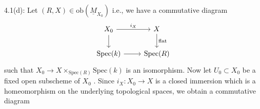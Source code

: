 4.1(d): Let $(R, X) \in \mathrm{ob}(\underline{M}_{X_0})$ i.e., we have a commutative diagram
\[
\begin{tikzcd}
X_0 \arrow[r, "i_X"] \arrow[d] & X \arrow[d, "\text{flat}"] \\
\mathrm{Spec}(k) \arrow[r] & \mathrm{Spec}(R)
\end{tikzcd}
\]
such that  $X_0 \to X \times_{\mathrm{Spec}(R)} \mathrm{Spec}(k)$  is an isomorphism. Now let  $U_0 \subset X_0$  be a fixed open subscheme of  $X_0$ . Since  $i_X : X_0 \to X$  is a closed immersion which is a homeomorphism on the underlying topological spaces, we obtain a commutative diagram

